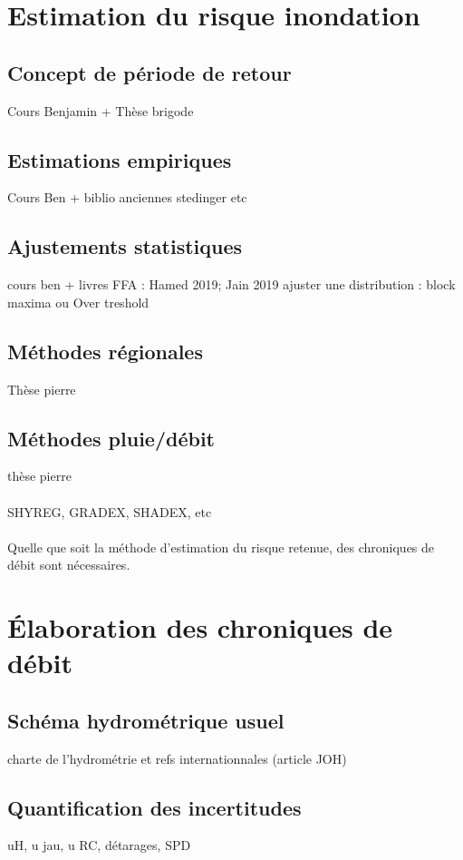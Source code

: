 \documentclass[11pt]{article}
\begin{document}
\section{Estimation du risque inondation}
		\subsection{Concept de période de retour}
		Cours Benjamin + Thèse brigode 
		
	    \subsection{Estimations empiriques}
	    Cours Ben + biblio anciennes stedinger etc
	    \subsection{Ajustements statistiques}
	    cours ben + livres FFA : Hamed 2019; Jain 2019
	    ajuster une distribution : block maxima ou Over treshold
	    \subsection{Méthodes régionales}
	    Thèse pierre
	    \subsection{Méthodes pluie/débit}
	    thèse pierre
	    \paragraph{} SHYREG, GRADEX, SHADEX, etc
	    
	    \paragraph{} Quelle que soit la méthode d'estimation du risque retenue, des chroniques de débit sont nécessaires.
	    
\section{Élaboration des chroniques de débit}
		\subsection{Schéma hydrométrique usuel}
		charte de l'hydrométrie et refs internationnales (article JOH)
		\subsection{Quantification des incertitudes}
		uH, u jau, u RC, détarages, SPD
		
\end{document}
